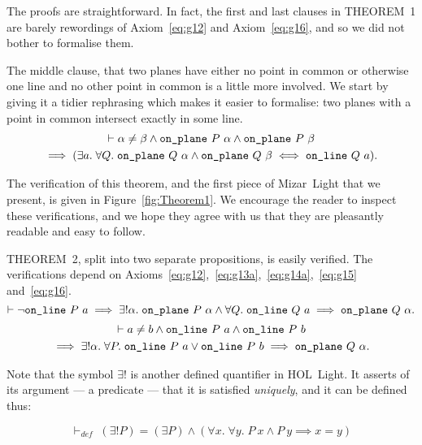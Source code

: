 The proofs are straightforward. In fact, the first and last clauses in THEOREM~1 are barely rewordings of Axiom~\ref{eq:g12} and Axiom~\ref{eq:g16}, and so we did not bother to formalise them.

The middle clause, that two planes have either no point in common or otherwise one line and no other point in common is a little more involved. We start by giving it a tidier rephrasing which makes it easier to formalise: two planes with a point in common intersect exactly in some line.
\begin{multline*}
  \vdash \alpha \neq \beta \wedge \texttt{on\_plane}\ P\ \alpha \wedge \texttt{on\_plane}\ P\ \beta\\
  \implies (\exists a.\; \forall Q.\; \texttt{on\_plane}\ Q\ \alpha \wedge \texttt{on\_plane}\ Q\ \beta \iff \texttt{on\_line}\ Q\ a).
\end{multline*}

The verification of this theorem, and the first piece of Mizar~Light that we present, is given in Figure~\ref{fig:Theorem1}. We encourage the reader to inspect these verifications, and we hope they agree with us that they are pleasantly readable and easy to follow. 

THEOREM~2, split into two separate propositions, is easily verified. The verifications depend on Axioms~\ref{eq:g12},~\ref{eq:g13a},~\ref{eq:g14a},~\ref{eq:g15} and~\ref{eq:g16}.
\begin{displaymath}
  \vdash\neg\texttt{on\_line}\ P\ a \implies \exists!\alpha.\; \texttt{on\_plane}\ P\ \alpha \wedge \forall Q.\; \texttt{on\_line}\ Q\ a \implies \texttt{on\_plane}\ Q\ \alpha.
\end{displaymath}
\begin{multline*}
  \vdash a\neq b\wedge\texttt{on\_line}\ P\ a\wedge\texttt{on\_line}\ P\ b\\
  \implies\exists!\alpha.\; \forall P.\; \texttt{on\_line}\ P\ a \vee \texttt{on\_line}\ P\ b \implies\texttt{on\_plane}\ Q\ \alpha.
\end{multline*}

Note that the symbol $\exists!$ is another defined quantifier in HOL~Light. It asserts of its argument --- a predicate --- that it is satisfied \emph{uniquely}, and it can be defined thus:

\begin{displaymath}
  \vdash_{def}\;(\exists! P) = (\exists P) \wedge (\forall x.\;\forall y.\; P\ x \wedge P\ y \implies x = y)
\end{displaymath}

